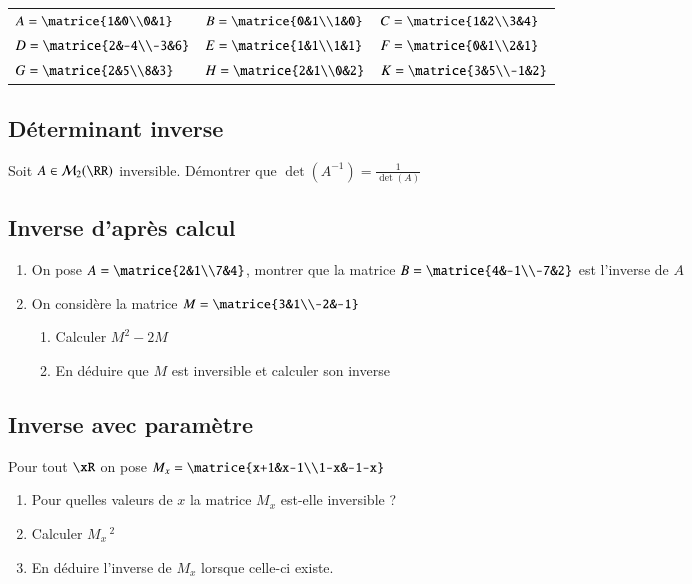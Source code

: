\documentclass[oneside,12pt]{article}          %
\begin{document}
\renewcommand{\arraystretch}{1.6}
    \begin{tabular}{p{} p{} p{}}
        $A=\matrice{1&0\\0&1}$ & $B=\matrice{0&1\\1&0}$ & $C=\matrice{1&2\\3&4} $  \\
        $D=\matrice{2&-4\\-3&6}$ & $E=\matrice{1&1\\1&1}$ & $F=\matrice{0&1\\2&1}$ \\
        $G=\matrice{2&5\\8&3} $ & $H=\matrice{2&1\\0&2} $ & $K=\matrice{3&5\\-1&2} $ \\
    \end{tabular}



\subsection{Déterminant inverse}
Soit $A\in\mathcal{M}_2(\RR)$ inversible. Démontrer que $\det(A^{-1})=\frac{1}{\det(A)}$



\subsection{Inverse d'après calcul}
\begin{enumerate}
    \item On pose $A=\matrice{2&1\\7&4}$, montrer que la matrice $B=\matrice{4&-1\\-7&2}$ est l'inverse de $A$

    \item On considère la matrice $M=\matrice{3&1\\-2&-1}$
        \begin{enumerate}
            \item Calculer $M^2-2M$
            \item En déduire que $M$ est inversible et calculer son inverse
        \end{enumerate}
\end{enumerate}



\subsection{Inverse avec paramètre}
Pour tout $\xR$ on pose $M_x=\matrice{x+1&x-1\\1-x&-1-x}$
    \begin{enumerate}
        \item Pour quelles valeurs de $x$ la matrice $M_x$ est-elle inversible ?
        \item Calculer $M_x\,^2$
        \item En déduire l'inverse de $M_x$ lorsque celle-ci existe.
    \end{enumerate}
\end{document}
